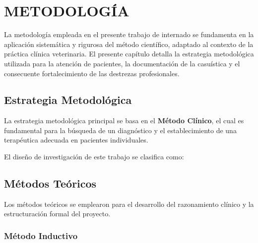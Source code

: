 \clearpage

\section{METODOLOGÍA}

	La metodología empleada en el presente trabajo de internado se fundamenta en la aplicación sistemática y rigurosa del método científico, adaptado al contexto de la práctica clínica veterinaria. El presente capítulo detalla la estrategia metodológica utilizada para la atención de pacientes, la documentación de la casuística y el consecuente fortalecimiento de las destrezas profesionales.

	\subsection{Estrategia Metodológica}

	La estrategia metodológica principal se basa en el \textbf{Método Clínico}, el cual es fundamental para la búsqueda de un diagnóstico y el establecimiento de una terapéutica adecuada en pacientes individuales.

	El diseño de investigación de este trabajo se clasifica como:


	\subsection{Métodos Teóricos}

	Los métodos teóricos se emplearon para el desarrollo del razonamiento clínico y la estructuración formal del proyecto.

	\subsubsection{Método Inductivo}

